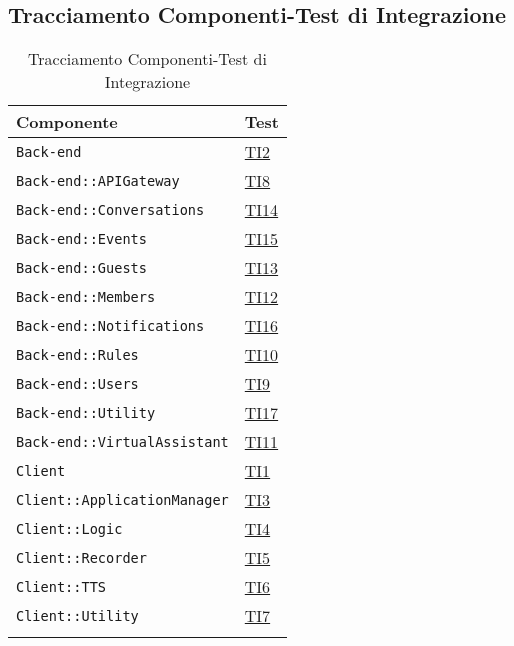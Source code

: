 \subsection{Tracciamento Componenti-Test di Integrazione}
\normalsize
\begin{longtable}{|>{\centering}m{9cm}|m{3cm}<{\centering}|}
\hline 
\textbf{Componente} & \textbf{Test}\\
\hline
\endhead
\texttt{Back-end} & \hyperlink{TI2}{TI2}\\ \hline
\texttt{Back-end::APIGateway} & \hyperlink{TI8}{TI8}\\ \hline
\texttt{Back-end::Conversations} & \hyperlink{TI14}{TI14}\\ \hline
\texttt{Back-end::Events} & \hyperlink{TI15}{TI15}\\ \hline
\texttt{Back-end::Guests} & \hyperlink{TI13}{TI13}\\ \hline
\texttt{Back-end::Members} & \hyperlink{TI12}{TI12}\\ \hline
\texttt{Back-end::Notifications} & \hyperlink{TI16}{TI16}\\ \hline
\texttt{Back-end::Rules} & \hyperlink{TI10}{TI10}\\ \hline
\texttt{Back-end::Users} & \hyperlink{TI9}{TI9}\\ \hline
\texttt{Back-end::Utility} & \hyperlink{TI17}{TI17}\\ \hline
\texttt{Back-end::VirtualAssistant} & \hyperlink{TI11}{TI11}\\ \hline
\texttt{Client} & \hyperlink{TI1}{TI1}\\ \hline
\texttt{Client::ApplicationManager} & \hyperlink{TI3}{TI3}\\ \hline
\texttt{Client::Logic} & \hyperlink{TI4}{TI4}\\ \hline
\texttt{Client::Recorder} & \hyperlink{TI5}{TI5}\\ \hline
\texttt{Client::TTS} & \hyperlink{TI6}{TI6}\\ \hline
\texttt{Client::Utility} & \hyperlink{TI7}{TI7}\\ \hline
\caption[Tracciamento Componenti-Test di Integrazione]{Tracciamento Componenti-Test di Integrazione}
\label{tabella:pkg-ti}
\end{longtable}
\clearpage

